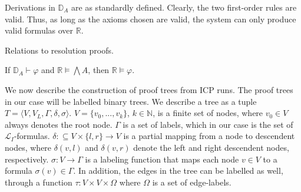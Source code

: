 \documentclass[envcountsect]{llncs}
\begin{document}
Derivations in $\mathbb{D}_A$ are as standardly defined. Clearly, the two
first-order rules are valid. Thus, as long as the axioms chosen are valid,
 the system can only produce valid formulas over $\mathbb{R}$.

\begin{remark}
Relations to resolution proofs.
\end{remark}


\begin{proposition}
If $\mathbb{D}_A\vdash \varphi$ and $\mathbb{R}\models \bigwedge A$, then $\mathbb{R}\models \varphi$.
\end{proposition}

We now describe the construction of proof trees from ICP runs. The proof trees in
our case will be labelled binary trees. We describe a tree as a tuple $T =
\langle V, V_L,  \Gamma, \delta, \sigma\rangle$. $V = \{v_0, ..., v_k\}$,
$k\in \mathbb{N}$, is a finite set of nodes, where $v_0\in V$ always denotes the
root
node. $\Gamma$ is a set of labels, which in our case is the set of
$\mathcal{L}_I$-formulas. $\delta:\subseteq V\times \{l,r\} \rightarrow V$ is a
partial mapping from a node to descendent nodes, where $\delta(v, l)$ and
$\delta(v, r)$ denote the left and right descendent nodes, respectively.
$\sigma: V\rightarrow \Gamma$ is a labeling function that maps each node
$v\in V$ to a formula $\sigma(v) \in \Gamma$. In addition, the edges in the
tree can be labelled as well, through a function $\tau: V\times V\times \Omega$
where $\Omega$ is a set of edge-labels. 
\end{document}

